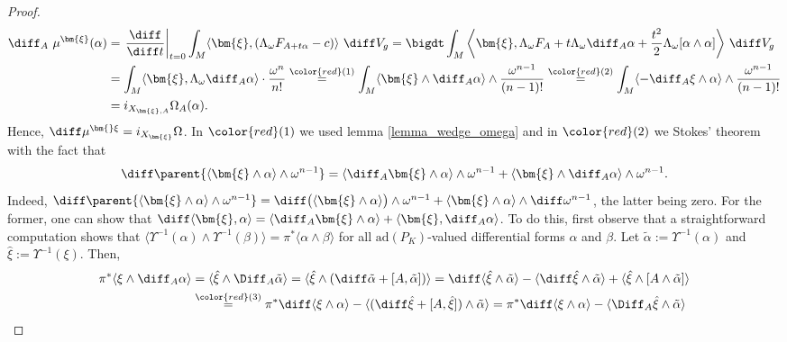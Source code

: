 {\begin{proof}
\begin{align*}
    \diff_A \  \mu^{\bm{\xi}}(\alpha) & = \left. \frac{\diff }{\diff t} \right|_{t=0} \int_M \langle \bm{\xi}, (\Lambda_\omega F_{A+t \alpha}-c) \rangle \ \diff V_g = \bigdt\int_M \bigg\langle \bm{\xi},  \Lambda_\omega F_A + t \Lambda_\omega  \diff_A \alpha +\frac{t^2}{2} \Lambda_\omega[\alpha \wedge \alpha ] \bigg\rangle \ \diff V_g   \\
    & = \int_M \langle \bm{\xi}, \Lambda_\omega \diff_A \alpha \rangle \cdot \frac{\omega^n}{n!} \overset{{\color{red}(1)}}{=}\int_M \langle \bm{\xi} \wedge \diff_A \alpha \rangle \wedge \frac{\omega^{n-1}}{(n-1)!} \overset{{\color{red}(2)}}{=} \int_M \langle -\diff_A \xi \wedge  \alpha \rangle \wedge \frac{\omega^{n-1}}{(n-1)!} \\
    & = i_{X_{\bm{\xi}, A}} \Omega_A(\alpha).
    \end{align*}
    Hence, \(\diff \mu^{\bm{}\xi}=i_{X_{\bm{\xi}}} \Omega\). In \({\color{red}(1)}\) we used lemma \ref{lemma_wedge_omega} and in \(\color{red}(2)\) we Stokes' theorem with the fact that 
    \[
    \diff \parent{\langle \bm{\xi} \wedge  \alpha \rangle \wedge \omega^{n-1}}=\langle \diff _A \bm{\xi} \wedge  \alpha \rangle \wedge \omega^{n-1} + \langle \bm{\xi}\wedge  \diff_A \alpha \rangle  \wedge \omega^{n-1}.
    \]
    Indeed, \(\diff \parent{\langle \bm{\xi} \wedge \alpha \rangle \wedge \omega^{n-1}}=\diff \big(\langle \bm{\xi} \wedge \alpha \rangle\big) \wedge \omega^{n-1}+\langle \bm{\xi} \wedge \alpha \rangle\wedge \diff \omega^{n-1}\), the latter being zero. For the former, one can show that \(\diff \langle \bm{\xi}, \alpha \rangle = \langle \diff_A \bm{\xi} \wedge \alpha \rangle  + \langle \bm{\xi} , \diff_A \alpha \rangle\). To do this, first observe that a straightforward computation shows that \(\langle \Upsilon^{-1}(\alpha) \wedge \Upsilon^{-1}(\beta)\rangle = \pi^*\langle \alpha \wedge \beta \rangle\) for all \(\mathrm{ad}(P_K)\)-valued differential forms \(\alpha\) and \(\beta\). Let \(\tilde{\alpha}:=\Upsilon^{-1}(\alpha)\) and \(\hat{\xi}:=\Upsilon^{-1}(\xi)\). Then,
    \begin{align*}
        \pi^* \langle\xi \wedge  \diff_A \alpha \rangle & = \langle\hat{\xi} \wedge \Diff_A \tilde{\alpha} \rangle=\langle \hat{\xi}\wedge (\diff \tilde{\alpha}+[A, \tilde{\alpha} ])  \rangle=\diff \langle \hat{\xi} \wedge \tilde{\alpha}\rangle- \langle\diff \hat{\xi}\wedge  \tilde{\alpha}\rangle + \langle  \hat{\xi}\wedge [A \wedge \tilde{\alpha}] \rangle \\
        & \overset{{\color{red}(3)}}{=} \pi^*\diff \langle\xi \wedge  \alpha \rangle - \langle (\diff \hat\xi + [A, \hat{\xi}]) \wedge \tilde{\alpha}\rangle = \pi^* \diff \langle\xi \wedge  \alpha  \rangle -\langle  \Diff_A \hat{\xi} \wedge \tilde{\alpha}  \rangle \\

\end{align*}
\end{proof}}
